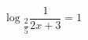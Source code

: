 \begin{ex}[type=equation]
	\begin{condition}
		$\log$\tiny$_{\dfrac{2}{5}}$\normalsize$\dfrac{1}{2x + 3} = 1$
	\end{condition}
\end{ex}